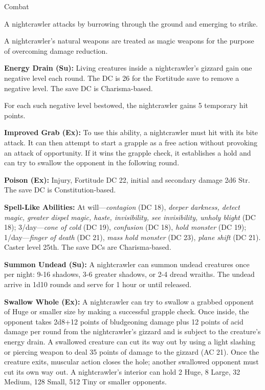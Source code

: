 \documentclass{article}
\begin{document}
Combat

A nightcrawler attacks by burrowing through the ground and emerging to strike.

A nightcrawler's natural weapons are treated as magic weapons for the purpose of 
overcoming damage reduction.

\textbf{Energy Drain (Su):} Living creatures inside a nightcrawler's gizzard gain 
one negative level each round. The DC is 26 for the Fortitude save to remove a 
negative level. The save DC is Charisma-based.

For each such negative level bestowed, the nightcrawler gains 5 temporary hit points. 

\textbf{Improved Grab (Ex):} To use this ability, a nightcrawler must hit with 
its bite attack. It can then attempt to start a grapple as a free action without 
provoking an attack of opportunity. If it wins the grapple check, it establishes 
a hold and can try to swallow the opponent in the following round.

\textbf{Poison (Ex):} Injury, Fortitude DC 22, initial and secondary damage 2d6 
Str. The save DC is Constitution-based.

\textbf{Spell-Like Abilities: }At will---\textit{contagion }(DC 18), \textit{deeper 
darkness, detect magic, greater dispel magic, haste, invisibility, see invisibility, 
unholy blight }(DC 18); 3/day---\textit{cone of cold }(DC 19), \textit{confusion 
}(DC 18), \textit{hold monster }(DC 19); 1/day---\textit{finger of death }(DC 21), 
\textit{mass hold monster }(DC 23), \textit{plane shift }(DC 21). Caster level 
25th. The save DCs are Charisma-based.

\textbf{Summon Undead (Su):} A nightcrawler can summon undead creatures once per 
night: 9-16 shadows, 3-6 greater shadows, or 2-4 dread wraiths. The undead arrive 
in 1d10 rounds and serve for 1 hour or until released.

\textbf{Swallow Whole (Ex):} A nightcrawler can try to swallow a grabbed opponent 
of Huge or smaller size by making a successful grapple check. Once inside, the 
opponent takes 2d8+12 points of bludgeoning damage plus 12 points of acid damage 
per round from the nightcrawler's gizzard and is subject to the creature's energy 
drain. A swallowed creature can cut its way out by using a light slashing or piercing 
weapon to deal 35 points of damage to the gizzard (AC 21). Once the creature exits, 
muscular action closes the hole; another swallowed opponent must cut its own way 
out. A nightcrawler's interior can hold 2 Huge, 8 Large, 32 Medium, 128 Small, 
512 Tiny or smaller opponents.
\end{document}
